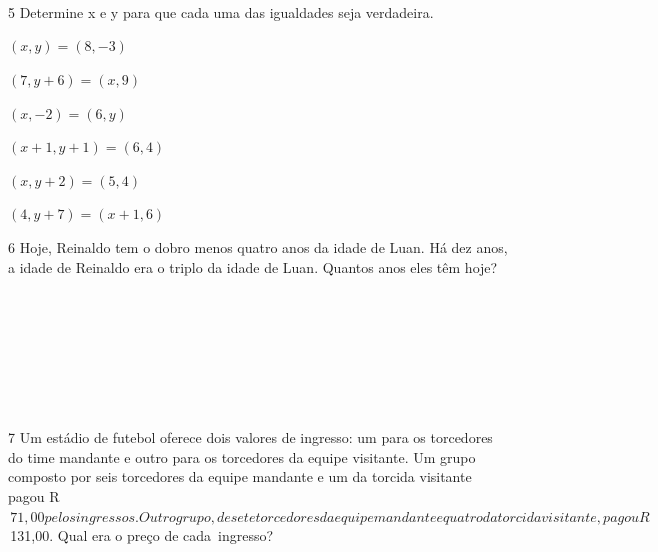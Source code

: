 \\

\\

\\

\num{5} Determine x e y para que cada uma das igualdades seja verdadeira.

\begin{escolha}
\item $(x, y ) = ( 8, -3)$
\item $(7, y + 6) = (x, 9)$
\item $(x, -2) = (6, y)$
\item $(x + 1, y + 1) = (6, 4)$
\item $(x, y + 2) = (5, 4)$
\item $(4, y + 7) = (x + 1, 6)$
\end{escolha}

\num{6} Hoje, Reinaldo tem o dobro menos quatro anos da idade de Luan. Há dez
anos, a idade de Reinaldo era o triplo da idade de Luan. Quantos anos
eles têm hoje?


\\

\\

\\

\\

\\

\\

\\

\num{7} Um estádio de futebol oferece dois valores de ingresso: um para os
torcedores do time mandante e outro para os torcedores da equipe visitante. Um
grupo composto por seis torcedores da equipe mandante e um da torcida
visitante pagou R$\,71,00 pelos ingressos. Outro grupo, de sete torcedores da
equipe mandante e quatro da torcida visitante, pagou R$\,131,00. Qual era o
preço de cada~ingresso?


